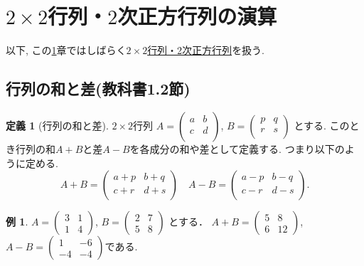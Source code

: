 \documentclass[dvipdfmx,a4paper,11pt]{article}
\theoremstyle{definition}
\newtheorem{dfn}[thm]{定義}
\newtheorem{exa}[thm]{例}
\begin{document}
\section{$2 \times 2$行列・$2$次正方行列の演算}
\label{sec-2}


以下, この\ref{sec-2}章ではしばらく\underline{$2 \times 2$行列・2次正方行列}を扱う. 

\subsection{行列の和と差(教科書1.2節)}

 \begin{tcolorbox}[
    colback = white,
    colframe = green!35!black,
    fonttitle = \bfseries,
    breakable = true]
    \begin{dfn}[行列の和と差]
    \text{}
 
$2 \times 2$行列
$
A=\begin{pmatrix}
a& b \\
c& d \\
\end{pmatrix}
$, 
$
B=\begin{pmatrix}
p& q \\
r& s\\
\end{pmatrix}
$
とする.
このとき行列の和$A+B$と差$A-B$を各成分の和や差として定義する.
つまり以下のように定める. 
$$
A+B=
\begin{pmatrix}
a +p& b +q\\
c+r& d+s \\
\end{pmatrix}
\quad
A-B=
\begin{pmatrix}
a -p& b -q\\
c-r & d-s \\
\end{pmatrix}.
$$
  \end{dfn}
 \end{tcolorbox}
 

\begin{exa}
 $A = 
 \begin{pmatrix}
 3&1 \\
 1&4
 \end{pmatrix}
 $, 
 $
 B = 
 \begin{pmatrix}
 2&7\\
 5&8
 \end{pmatrix}
 $
 とする．
$
 A+B =
 \begin{pmatrix}
 5&8 \\
6&12
 \end{pmatrix}
 $, 
 $
  A-B =
 \begin{pmatrix}
 1&-6 \\
 -4&-4
 \end{pmatrix}
 $である.
 \end{exa}
\end{document}
